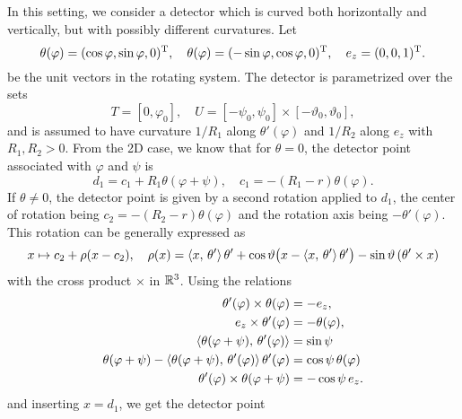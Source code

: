 \documentclass{amsart}
\renewcommand*{\phi}{\varphi}
\begin{document}
In this setting, we consider a detector which is curved both horizontally and vertically, but with possibly different curvatures. Let
%
\begin{equation}
 \label{eq:conecurved:unitvecs}
 \theta(\phi) = \TRANSP{(\cos\phi, \sin\phi, 0)}, \quad \theta(\phi) = \TRANSP{(-\sin\phi, \cos\phi, 0)}, \quad e_z = \TRANSP{(0, 0, 1)}.
\end{equation}
%
be the unit vectors in the rotating system. The detector is parametrized over the sets
%
\begin{equation}
 \label{eq:conecurved:params}
 T = [0, \phi_0],\quad U = [-\psi_0, \psi_0] \times [-\vartheta_0, \vartheta_0],
\end{equation}
%
and is assumed to have curvature $1/R_1$ along $\theta'(\phi)$ and $1/R_2$ along $e_z$ with $R_1,R_2 >0$. From the 2D case, we know that 
for $\theta=0$, the detector point associated with $\phi$ and $\psi$ is
%
\begin{equation*}
 d_1 = c_1 + R_1 \theta(\phi + \psi), \quad c_1 = -(R_1 - r) \theta(\phi).
\end{equation*}
%
If $\theta \neq 0$, the detector point is given by a second rotation applied to $d_1$, the center of rotation being $c_2 = -(R_2 - r) 
\theta(\phi)$ and the rotation axis being $-\theta'(\phi)$. This rotation can be generally expressed as
%
\begin{equation*}
 x \mapsto c_2 + \rho(x - c_2), \quad \rho(x) = \langle x,\,\theta'\rangle\, \theta' + \cos\vartheta \big(x - \langle x,\,\theta'\rangle\, \theta'\big) 
 - \sin\vartheta\, (\theta' \times x)
\end{equation*}
%
with the cross product $\times$ in ${\mathbb{R}}^3$. Using the relations
%
\begin{align*}
 \theta'(\phi) \times \theta(\phi) &= -e_z, \\
 e_z \times \theta'(\phi) &= -\theta(\phi), \\
 \INNER{\theta(\phi + \psi)}{\theta'(\phi)} &= \sin\psi \\
 \theta(\phi + \psi) - \INNER{\theta(\phi + \psi)}{\theta'(\phi)}\, \theta'(\phi) &= \cos\psi\, \theta(\phi)\\
 \theta'(\phi) \times \theta(\phi + \psi) &= -\cos\psi\, e_z.
\end{align*}
%
and inserting $x = d_1$, we get the detector point
%
\end{document}
